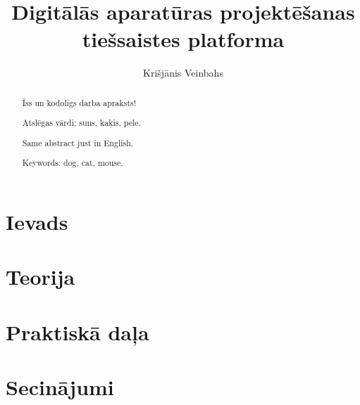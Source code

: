 \documentclass{LU}
\title{Digitālās aparatūras projektēšanas tiešsaistes platforma}
\author{Krišjānis Veinbahs}
\begin{document}
\maketitle

\begin{abstract}
    Īss un kodolīgs darba apraksts!

    Atslēgas vārdi: suns, kaķis, pele.
\end{abstract}
 

\begin{abstract}
    Same abstract just in English.

    Keywords: dog, cat, mouse.
\end{abstract}


\tableofcontents


\printglossary[type=main,title={Apzīmējumu saraksts},toctitle={Apzīmējumu saraksts}]


\chapter*{Ievads} %
\pagestyle{plain}



\chapter{Teorija}


\chapter{Praktiskā daļa}



\chapter*{Secinājumi}

\end{document}
